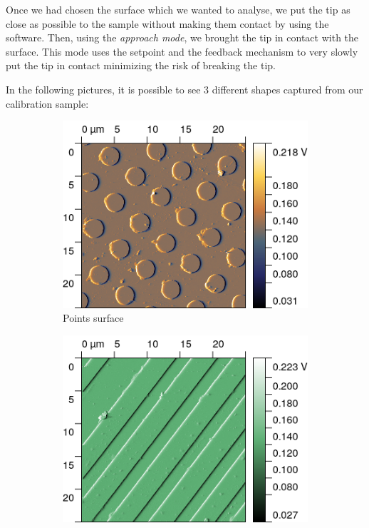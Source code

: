 \documentclass[11pt,a4paper]{article}
\begin{document}
Once we had chosen the surface which we wanted to analyse, we put the tip as close as possible to the sample without making them contact by using the software. Then, using the \emph{approach mode}, we brought the tip in contact with the surface. This mode uses the setpoint and the feedback mechanism to very slowly put the tip in contact minimizing the risk of breaking the tip.

In the following pictures, it is possible to see 3 different shapes captured from our calibration sample:

\begin{figure}[H]
\centering
\begin{subfigure}[b]{0.45\textwidth}
\includegraphics[width=\textwidth]{sm_points}
\caption{Points surface}
\label{fig:sm_points}
\end{subfigure}
\begin{subfigure}[b]{0.45\textwidth}
\includegraphics[width=\textwidth]{sm_raws}

\end{subfigure}
\end{figure}
\end{document}
